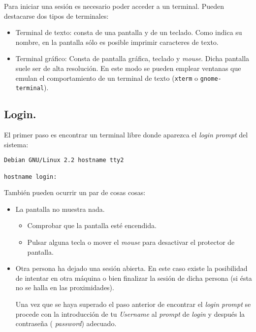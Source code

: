 Para iniciar una sesi{\'o}n es necesario poder acceder a un terminal.
Pueden destacarse dos tipos de terminales:

\begin{itemize}
\item Terminal de texto: consta de una pantalla y de un teclado. Como
  indica su nombre, en la pantalla s{\'o}lo es posible imprimir caracteres
  de texto.
  
\item Terminal gr{\'a}fico: Consta de pantalla gr{\'a}fica, teclado y {\it
    mouse}.  Dicha pantalla suele ser de alta resoluci{\'o}n.  En este
  modo se pueden emplear ventanas que emulan el comportamiento de un
  terminal de texto (\verb+xterm+ o \verb+gnome-terminal+).

\end{itemize}

\subsection{Login.}

El primer paso es encontrar un terminal libre donde aparezca el {\it
  login prompt} del sistema:

\begin{verbatim}
Debian GNU/Linux 2.2 hostname tty2

hostname login:
\end{verbatim}


Tambi{\'e}n pueden ocurrir un par de cosas cosas:

\begin{itemize}

\item La pantalla no muestra nada.

\begin{itemize}

\item Comprobar que la pantalla est{\'e} encendida.
\item Pulsar alguna tecla o mover el {\it mouse} para desactivar el
  protector de pantalla.

\end{itemize}

\item Otra persona ha dejado una sesi{\'o}n abierta. En este caso existe
  la posibilidad de intentar en otra m{\'a}quina o bien finalizar la
  sesi{\'o}n de dicha persona (si {\'e}sta no se halla en las proximidades).
  
  Una vez que se haya superado el paso anterior de encontrar el {\it
    login prompt} se procede con la introducci{\'o}n de tu {\it Username}
  al {\it prompt} de {\it login} y despu{\'e}s la contrase{\~n}a ({\it
    password}) adecuado.

\end{itemize}

